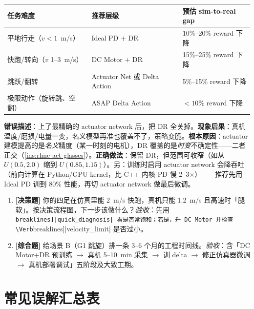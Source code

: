 \begin{center}
\small
\begin{tabular}{@{}lll@{}}
\toprule
任务难度 & 推荐层级 & 预估 sim-to-real gap \\
\midrule
平地行走（$v<1$~m/s） & Ideal PD $+$ DR & 10\%--20\% reward 下降 \\
快跑/转向（$v$ 1--3~m/s） & DC Motor $+$ DR & 15\%--25\% reward 下降 \\
跳跃/翻转 & Actuator Net 或 Delta Action & 5\%--15\% reward 下降 \\
极限动作（旋转跳、空翻） & ASAP Delta Action & $<10\%$ reward 下降 \\
\bottomrule
\end{tabular}
\end{center}

\begin{pitfall}
\textbf{错误描述}：上了最精确的 actuator network 后，把 DR 全关掉。\textbf{现象后果}：真机温度/磨损/电量一变，名义模型再准也覆盖不了，策略变脆。\textbf{根本原因}：actuator 建模提高的是\emph{名义}精度（某一时刻的电机），DR 覆盖的是\emph{时变}不确定性——二者正交（\cref{ins:rlmc-act-glasses}）。\textbf{正确做法}：保留 DR，但范围可收窄（如从 $U(0.5,2.0)$ 缩到 $U(0.85,1.15)$）。另：训练时启用 actuator network 会降吞吐（前向计算在 Python/GPU kernel，比 C++ 内核 PD 慢 2--3$\times$）——推荐先用 Ideal PD 训到 80\% 性能，再切 actuator network 做最后微调。
\end{pitfall}

\begin{practice}[本节练习]
\begin{enumerate}
  \item \textbf{[决策题]} 你的四足在仿真里能 2~m/s 快跑，真机只能 1.2~m/s 且高速时「腿软」。按决策流程图，下一步该做什么？\emph{验收}：先用 \Verb[breaklines]|quick_diagnosis| 看是否常饱和；若是，升 DC Motor 并检查 \Verb[breaklines]|velocity_limit| 是否过小。
  \item \textbf{[综合题]} 给场景 B（G1 跳旋）排一条 3--6 个月的工程时间线。\emph{验收}：含「DC Motor$+$DR 预训练 $\to$ 真机 5--10~min 采集 $\to$ 训 delta $\to$ 修正仿真器微调 $\to$ 真机部署调试」五阶段及大致工期。
\end{enumerate}
\end{practice}

\section*{常见误解汇总表}
\label{sec:rlmc-act-misconceptions}

